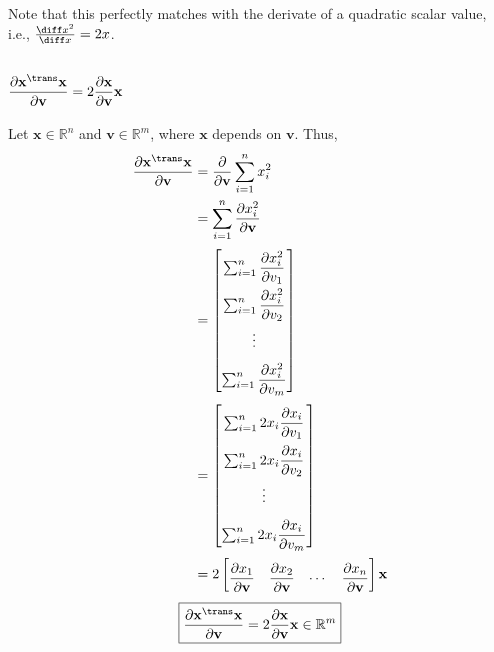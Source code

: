 Note that this perfectly matches with the derivate of a quadratic scalar value, i.e., \(\frac{\diff x^2}{\diff x} = 2x\).

\subsection{\(\dfrac{\partial \mathbf{x}^\trans \mathbf{x}}{\partial \mathbf{v}} = 2\dfrac{\partial \mathbf{x}}{\partial \mathbf{v}}\mathbf{x}\)}
Let \(\mathbf{x} \in \mathbb{R}^{n}\) and \(\mathbf{v}\in \mathbb{R}^m\), where \(\mathbf{x}\) depends on \(\mathbf{v}\). Thus,
\begin{align}
    \dfrac{\partial \mathbf{x}^\trans \mathbf{x}}{\partial \mathbf{v}} & = \dfrac{\partial}{\partial \mathbf{v}}\sum_{i=1}^{n} x_i^2 \\
    & = \sum_{i=1}^{n} \dfrac{\partial x_i^2}{\partial \mathbf{v}} \\
    & = \renewcommand{\arraystretch}{2.2}\begin{bmatrix}
        \sum_{i=1}^{n} \dfrac{\partial x_i^2}{\partial v_1} \\
        \sum_{i=1}^{n} \dfrac{\partial x_i^2}{\partial v_2} \\
        \vdots \\
        \sum_{i=1}^{n} \dfrac{\partial x_i^2}{\partial v_m} \\
    \end{bmatrix} \\
    & = \renewcommand{\arraystretch}{2.2}\begin{bmatrix}
        \sum_{i=1}^{n} 2x_i\dfrac{\partial x_i}{\partial v_1} \\
        \sum_{i=1}^{n} 2x_i\dfrac{\partial x_i}{\partial v_2} \\
        \vdots \\
        \sum_{i=1}^{n} 2x_i\dfrac{\partial x_i}{\partial v_m} \\
    \end{bmatrix} \\
    & = 2 \renewcommand{\arraystretch}{2.2}\begin{bmatrix}
        \dfrac{\partial x_1}{\partial \mathbf{v}} & \dfrac{\partial x_2}{\partial \mathbf{v}} & \cdots & \dfrac{\partial x_n}{\partial \mathbf{v}}
    \end{bmatrix} \mathbf{x}
\end{align}
\begin{align}
    \boxed{\dfrac{\partial \mathbf{x}^\trans \mathbf{x}}{\partial \mathbf{v}} = 2\dfrac{\partial \mathbf{x}}{\partial \mathbf{v}}\mathbf{x} \in \mathbb{R}^m}
\end{align}

